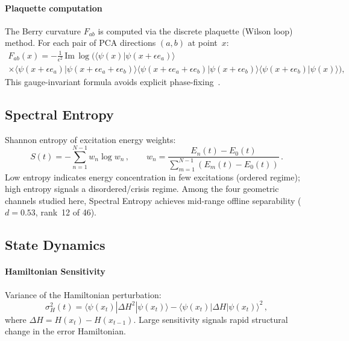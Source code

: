 \documentclass[3p]{elsarticle}
\newcommand{\braket}[2]{\langle#1|#2\rangle}
\newcommand{\dbraket}[3]{\langle#1|#2|#3\rangle}
\begin{document}
\paragraph{Plaquette computation}
The Berry curvature $F_{ab}$ is computed via the discrete plaquette
(Wilson loop) method.  For each pair of PCA directions $(a,b)$ at
point~$x$:
\begin{multline}\label{eq:plaquette}
  F_{ab}(x) = -\frac{1}{\epsilon^2}\,
    \mathrm{Im}\,\log\bigl(
    \braket{\psi(x)}{\psi(x{+}\epsilon e_a)} \\
    \times\braket{\psi(x{+}\epsilon e_a)}{\psi(x{+}\epsilon e_a{+}\epsilon e_b)}
    \braket{\psi(x{+}\epsilon e_a{+}\epsilon e_b)}{\psi(x{+}\epsilon e_b)}
    \braket{\psi(x{+}\epsilon e_b)}{\psi(x)}
  \bigr),
\end{multline}
This gauge-invariant formula avoids explicit phase-fixing~\cite{berry1984,simon1983}.

\subsection{Spectral Entropy}\label{subsec:spectral_entropy}

Shannon entropy of excitation energy weights:
\begin{equation}\label{eq:spectral_entropy}
  S(t) = -\sum_{n=1}^{N-1} w_n \log w_n\,,\qquad
  w_n = \frac{E_n(t) - E_0(t)}{\sum_{m=1}^{N-1}(E_m(t) - E_0(t))}\,.
\end{equation}
Low entropy indicates energy concentration in few excitations
(ordered regime); high entropy signals a disordered/crisis regime.
Among the four geometric channels studied here, Spectral Entropy
achieves mid-range offline separability ($d = 0.53$, rank~12 of 46).

\subsection{State Dynamics}%
\label{subsec:ham_sensitivity}\label{subsec:reduced_purity}

\paragraph{Hamiltonian Sensitivity}
Variance of the Hamiltonian perturbation:
\begin{equation}\label{eq:ham_sensitivity}
  \sigma^2_H(t) = \dbraket{\psi(x_t)}{\Delta H^2}{\psi(x_t)}
    - \dbraket{\psi(x_t)}{\Delta H}{\psi(x_t)}^2\,,
\end{equation}
where $\Delta H = H(x_t) - H(x_{t-1})$.  Large sensitivity signals
rapid structural change in the error Hamiltonian.
\end{document}
